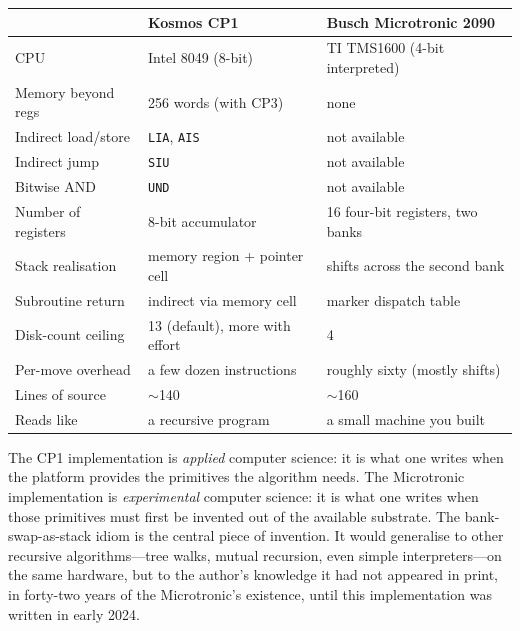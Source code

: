 \documentclass[11pt,a4paper]{article}
\begin{document}
\begin{center}
\small
\begin{tabular}{p{4.6cm}p{4.6cm}p{4.6cm}}
\toprule
 & \textbf{Kosmos CP1} & \textbf{Busch Microtronic 2090} \\
\midrule
CPU                       & Intel 8049 (8-bit)             & TI TMS1600 (4-bit interpreted) \\
Memory beyond regs        & 256 words (with CP3)            & none \\
Indirect load/store       & \texttt{LIA}, \texttt{AIS}      & not available \\
Indirect jump             & \texttt{SIU}                    & not available \\
Bitwise AND               & \texttt{UND}                    & not available \\
Number of registers       & 8-bit accumulator               & 16 four-bit registers, two banks \\
Stack realisation         & memory region + pointer cell    & shifts across the second bank \\
Subroutine return         & indirect via memory cell        & marker dispatch table \\
Disk-count ceiling        & 13 (default), more with effort  & 4 \\
Per-move overhead         & a few dozen instructions        & roughly sixty (mostly shifts) \\
Lines of source           & $\sim$140                       & $\sim$160 \\
Reads like                & a recursive program             & a small machine you built \\
\bottomrule
\end{tabular}
\end{center}

\bigskip

\noindent
The CP1 implementation is \emph{applied} computer science: it is what
one writes when the platform provides the primitives the algorithm
needs. The Microtronic implementation is \emph{experimental} computer
science: it is what one writes when those primitives must first be
invented out of the available substrate. The bank-swap-as-stack idiom
is the central piece of invention. It would generalise to other
recursive algorithms---tree walks, mutual recursion, even simple
interpreters---on the same hardware, but to the author's knowledge it
had not appeared in print, in forty-two years of the Microtronic's
existence, until this implementation was written in early 2024.
\end{document}
